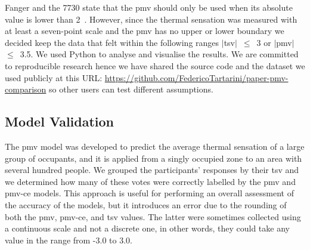 Fanger and the \gls{7730} state that the \ac{pmv} should only be used when its absolute value is lower than 2~\cite{Fanger1970, iso7730}.
However, since the thermal sensation was measured with at least a seven-point scale and the \ac{pmv} has no upper or lower boundary we decided keep the data that felt within the following ranges $|$\ac{tsv}$|$~$\leq$~\num{3} or $|$\ac{pmv}$|$~$\leq$~\num{3.5}.
We used Python to analyse and visualise the results.
We are committed to reproducible research hence we have shared the source code and the dataset we used publicly at this URL: \url{https://github.com/FedericoTartarini/paper-pmv-comparison} so other users can test different assumptions.

\subsection{Model Validation}\label{subsec:model-validation}
The \ac{pmv} model was developed to predict the average thermal sensation of a large group of occupants, and it is applied from a singly occupied zone to an area with several hundred people.
We grouped the participants' responses by their \ac{tsv} and we determined how many of these votes were correctly labelled by the \ac{pmv} and \ac{pmv-ce} models.
This approach is useful for performing an overall assessment of the accuracy of the models, but it introduces an error due to the rounding of both the \ac{pmv}, \ac{pmv-ce}, and \ac{tsv} values.
The latter were sometimes collected using a continuous scale and not a discrete one, in other words, they could take any value in the range from -3.0 to 3.0.

